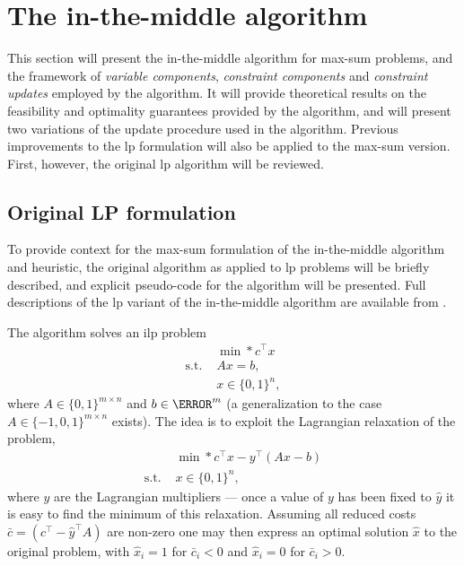 \section{The in-the-middle algorithm}
This section will present the in-the-middle algorithm for max-sum problems, and the framework of \emph{variable components}, \emph{constraint components} and \emph{constraint updates} employed by the algorithm.
It will provide theoretical results on the feasibility and optimality guarantees provided by the algorithm, and will present two variations of the update procedure used in the algorithm.
Previous improvements to the \gls{lp} formulation will also be applied to the max-sum version.
First, however, the original \gls{lp} algorithm will be reviewed.

\subsection{Original LP formulation}
To provide context for the max-sum formulation of the in-the-middle algorithm and heuristic, the original algorithm as applied to \gls{lp} problems will be briefly described, and explicit pseudo-code for the algorithm will be presented.
Full descriptions of the \gls{lp} variant of the in-the-middle algorithm are available from \textcites{Wedelin95}{Bastert10}.

The algorithm solves an \gls{ilp} problem
\begin{equation}\label{eq:ilp}
	\begin{aligned}
		{}           & \min*{c^\top x} \\
		\text{s.t. } & Ax = b, \\
		{}           & x \in \{0,1\}^n,
	\end{aligned}
\end{equation}
where \(A \in \{0,1\}^{m\times n}\) and \(b\in\N^m\) (a generalization to the case \(A \in \{-1,0,1\}^{m\times n}\) exists).
The idea is to exploit the Lagrangian relaxation of the problem,
\begin{equation}\label{eq:ilp-lagrange}
	\begin{aligned}
		{}           & \min*{c^\top x - y^\top (Ax - b)}\\
		\text{s.t. } & x \in \{0,1\}^n,
	\end{aligned}
\end{equation}
where \(y\) are the Lagrangian multipliers --- once a value of \(y\) has been fixed to \(\hat{y}\) it is easy to find the minimum of this relaxation.
Assuming all reduced costs \(\bar{c} = (c^\top - \hat{y}^\top A)\) are non-zero one may then express an optimal solution \(\hat{x}\) to the original problem, with \(\hat{x}_i = 1\) for \(\bar{c}_i < 0\) and \(\hat{x}_i = 0\) for \(\bar{c}_i > 0\).

